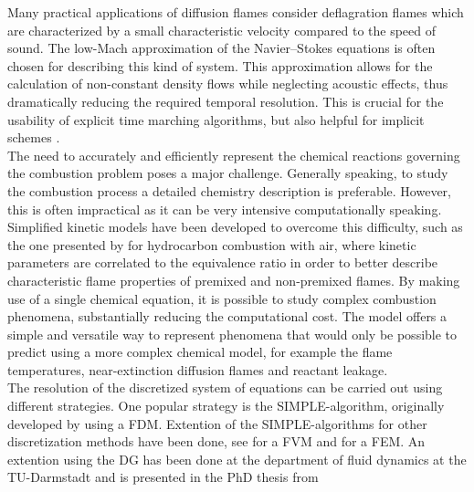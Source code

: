 Many practical applications of diffusion flames consider deflagration flames \parencite{poinsotTheoreticalNumericalCombustion2005} which are characterized by a small characteristic velocity compared to the speed of sound. The low-Mach approximation of the Navier--Stokes equations is often chosen for describing this kind of system. This approximation allows for the calculation of non-constant density flows while neglecting acoustic effects, thus dramatically reducing the required temporal resolution. This is crucial for the usability of explicit time marching algorithms, but also helpful for implicit schemes \parencite{mullerLowMachNumberAsymptoticsNavierStokes1998}.\\

The need to accurately and efficiently represent the chemical reactions governing the combustion problem poses a major challenge. Generally speaking, to study the combustion process a detailed chemistry description is preferable. However, this is often impractical as it can be very intensive computationally speaking. Simplified kinetic models have been developed to overcome this difficulty, such as the one presented by \textcite{fernandez-tarrazoSimpleOnestepChemistry2006} for hydrocarbon combustion with air, where kinetic parameters are correlated to the equivalence ratio in order to better describe characteristic flame properties of premixed and non-premixed flames. By making use of a single chemical equation, it is possible to study complex combustion phenomena, substantially reducing the computational cost.  The model  offers a simple and versatile way to represent phenomena that would only be possible to predict using a more complex chemical model, for example the flame temperatures, near-extinction diffusion flames and reactant leakage.\\


The resolution of the discretized system of equations can be carried out using different strategies. One popular strategy is the SIMPLE-algorithm, originally developed by \parencite{patankarNumericalHeatTransfer1980} using a \gls{FDM}. Extention of the SIMPLE-algorithms for other discretization methods have been done, see \parencite{ferzigerComputationalMethodsFluid2002} for a \gls{FVM} and \parencite{haroutunianSegregatedFiniteElement1993} for a \gls{FEM}. An extention using the \gls{DG} has been done at the department of fluid dynamics at the TU-Darmstadt and is presented in the PhD thesis from \textcite{kleinHighorderDiscontinuousGalerkin2015}

